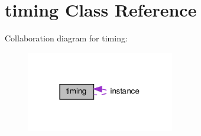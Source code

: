 \hypertarget{classtiming}{}\section{timing Class Reference}
\label{classtiming}


Collaboration diagram for timing\+:
\nopagebreak
\begin{figure}[H]
\begin{center}
\leavevmode
\includegraphics[width=182pt]{classtiming__coll__graph}
\end{center}
\end{figure}
